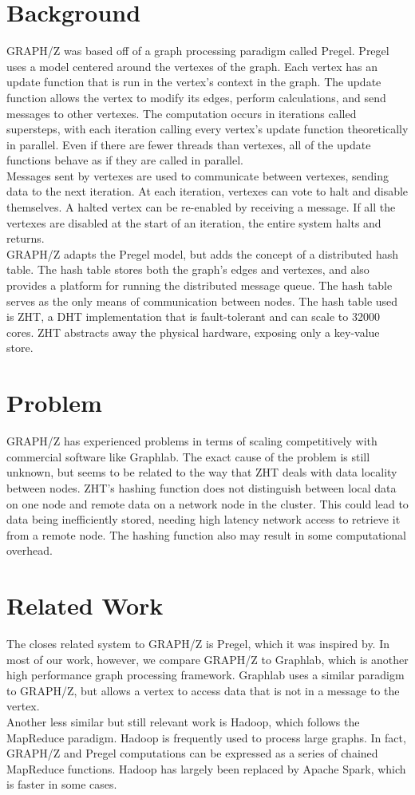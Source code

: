 \documentclass[10pt]{article}
\begin{document}
\begin{multicols}{2} 
  \section{Background}
  GRAPH/Z was based off of a graph processing paradigm called Pregel. Pregel uses a model centered around the vertexes of the graph. Each vertex has an update function that is run in the vertex's context in the graph. The update function allows the vertex to modify its edges, perform calculations, and send messages to other vertexes. The computation occurs in iterations called supersteps, with each iteration calling every vertex's update function theoretically in parallel. Even if there are fewer threads than vertexes, all of the update functions behave as if they are called in parallel.\\
  Messages sent by vertexes are used to communicate between vertexes, sending data to the next iteration. At each iteration, vertexes can vote to halt and disable themselves. A halted vertex can be re-enabled by receiving a message. If all the vertexes are disabled at the start of an iteration, the entire system halts and returns.\\
  GRAPH/Z adapts the Pregel model, but adds the concept of a distributed hash table. The hash table stores both the graph's edges and vertexes, and also provides a platform for running the distributed message queue. The hash table serves as the only means of communication between nodes. The hash table used is ZHT, a DHT implementation that is fault-tolerant and can scale to 32000 cores. ZHT abstracts away the physical hardware, exposing only a key-value store. 
  \section{Problem}
  GRAPH/Z has experienced problems in terms of scaling competitively  with commercial software like Graphlab. The exact cause of the problem is still unknown, but seems to be related to the way that ZHT deals with data locality between nodes. ZHT's hashing function does not distinguish between local data on one node and remote data on a network node in the cluster. This could lead to data being inefficiently stored, needing high latency network access to retrieve it from a remote node. The hashing function also may result in some computational overhead. 
  \section{Related Work}
  The closes related system to GRAPH/Z is Pregel, which it was inspired by. In most of our work, however, we compare GRAPH/Z to Graphlab, which is another high performance graph processing framework. Graphlab uses a similar paradigm to GRAPH/Z, but allows a vertex to access data that is not in a message to the vertex. \\
  Another less similar but still relevant work is Hadoop, which follows the MapReduce paradigm. Hadoop is frequently used to process large graphs. In fact, GRAPH/Z and Pregel computations can be expressed as a series of chained MapReduce functions. Hadoop has largely been replaced by Apache Spark, which is faster in some cases.    

\end{multicols}
\end{document}
